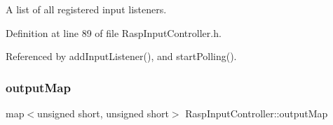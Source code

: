 A list of all registered input listeners. 



Definition at line 89 of file Rasp\+Input\+Controller.\+h.



Referenced by add\+Input\+Listener(), and start\+Polling().

\mbox{\label{class_rasp_input_controller_a7b59eba5cc562eccc91347ddbd777e50}} 
\subsubsection{\texorpdfstring{output\+Map}{outputMap}}
{\footnotesize\ttfamily map$<$unsigned short, unsigned short$>$ Rasp\+Input\+Controller\+::output\+Map\hspace{0.3cm}{\ttfamily [private]}}

